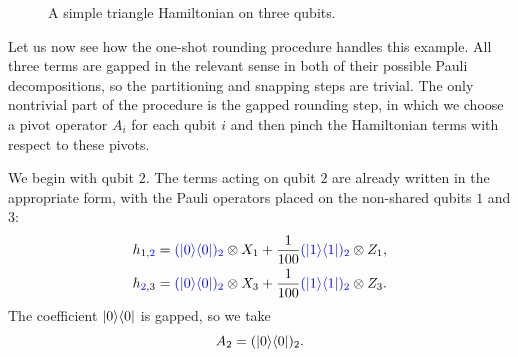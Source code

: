 \documentclass[a4paper,onecolumn,11pt]{quantumarticle}
\theoremstyle{plain}
\newcommand{\blue}[1]{{\color{blue}#1}}
\newcommand{\proj}[1]{\ket{#1}\!\bra{#1}}
\begin{document}
\begin{figure}[t]
\centering
{}
\caption{A simple triangle Hamiltonian on three qubits.}
\label{fig:triangle2}
\end{figure}

Let us now see how the one-shot rounding procedure handles this example.
All three terms are gapped in the relevant sense in both of their possible
Pauli decompositions, so the partitioning and snapping steps are trivial.
The only nontrivial part of the procedure is the gapped rounding step, in
which we choose a pivot operator $A_i$ for each qubit $i$ and then pinch
the Hamiltonian terms with respect to these pivots.

We begin with qubit $2$.  The terms acting on qubit $2$ are already
written in the appropriate form, with the Pauli operators placed on the
non-shared qubits $1$ and $3$:
\begin{align*}
    h_{1,\blue{2}}
        &= \blue{(\proj{0})_2} \otimes X_1
        + \frac{1}{100} \blue{(\proj{1})_2} \otimes Z_1, \\
    h_{\blue{2},3}
        &= \blue{(\proj{0})_2} \otimes X_3
        + \frac{1}{100} \blue{(\proj{1})_2} \otimes Z_3.
\end{align*}
The coefficient $\proj{0}$ is gapped, so we take
\[
    A_2 = (\proj{0})_2 .
\]
\end{document}
